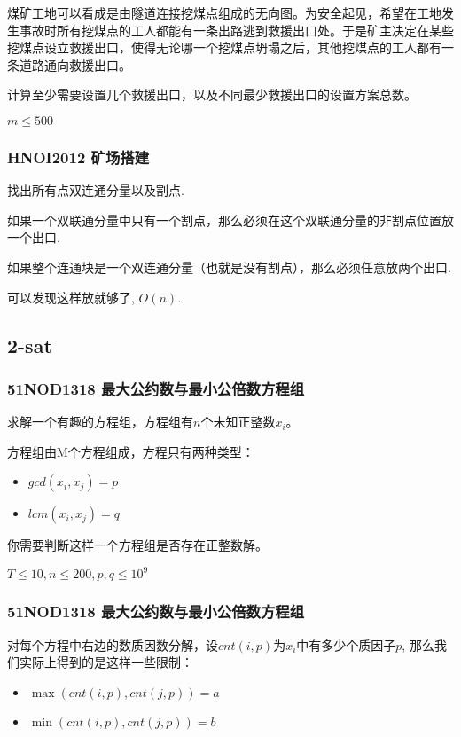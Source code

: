 \documentclass[10pt]{beamer}
\begin{document}
\begin{CJK}{UTF8}{gkai}
\begin{spacing}{1.1}
\begin{frame}
	煤矿工地可以看成是由隧道连接挖煤点组成的无向图。为安全起见，希望在工地发生事故时所有挖煤点的工人都能有一条出路逃到救援出口处。于是矿主决定在某些挖煤点设立救援出口，使得无论哪一个挖煤点坍塌之后，其他挖煤点的工人都有一条道路通向救援出口。

	计算至少需要设置几个救援出口，以及不同最少救援出口的设置方案总数。

	$m \le 500$

\end{frame}

\begin{frame}
\frametitle{HNOI2012 矿场搭建}

	找出所有点双连通分量以及割点.\pause
	
	如果一个双联通分量中只有一个割点，那么必须在这个双联通分量的非割点位置放一个出口. 

	如果整个连通块是一个双连通分量（也就是没有割点），那么必须任意放两个出口. \pause

	可以发现这样放就够了, $O(n)$.

\end{frame}

\subsection{2-sat}
\begin{frame}
\frametitle{51NOD1318 最大公约数与最小公倍数方程组}
	
	求解一个有趣的方程组，方程组有$n$个未知正整数$x_i$。

	方程组由M个方程组成，方程只有两种类型：

	\begin{itemize}
		\item $gcd(x_i, x_j) = p$
		\item $lcm(x_i, x_j) = q$
	\end{itemize}

	你需要判断这样一个方程组是否存在正整数解。
	
	$T \le 10, n \le 200, p, q \le 10^9$

\end{frame}

\begin{frame}
\frametitle{51NOD1318 最大公约数与最小公倍数方程组}

	对每个方程中右边的数质因数分解，设$cnt(i, p)$为$x_i$中有多少个质因子$p$, 那么我们实际上得到的是这样一些限制：

	\begin{itemize}
		\item $\max(cnt(i, p), cnt(j, p)) = a$
		\item $\min(cnt(i, p), cnt(j, p)) = b$
	\end{itemize}


\end{frame}
\end{spacing}
\end{CJK}
\end{document}
